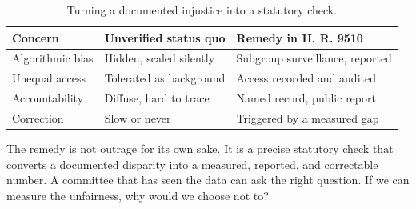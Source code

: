 \begin{table}[H]
\footnotesize
\begin{tabularx}{\textwidth}{@{}L{4.3cm} Y Y@{}}
\toprule
\textbf{Concern} & \textbf{Unverified status quo} & \textbf{Remedy in H. R. 9510}\\
\midrule
Algorithmic bias & Hidden, scaled silently & Subgroup surveillance, reported\\
Unequal access & Tolerated as background & Access recorded and audited\\
Accountability & Diffuse, hard to trace & Named record, public report\\
Correction & Slow or never & Triggered by a measured gap\\
\bottomrule
\end{tabularx}
\caption{Turning a documented injustice into a statutory check.}
\label{tab:outrage}
\end{table}

The remedy is not outrage for its own sake. It is a precise statutory check that
converts a documented disparity into a measured, reported, and correctable number.
A committee that has seen the data can ask the right question. If we can measure
the unfairness, why would we choose not to?
